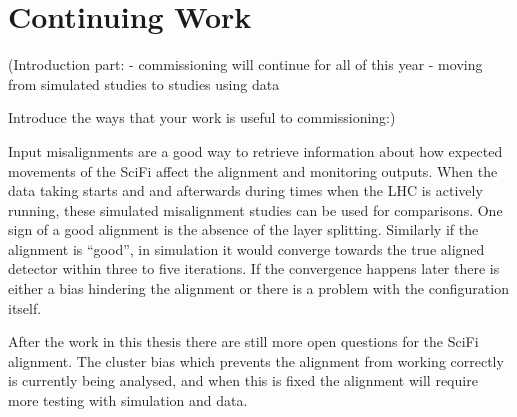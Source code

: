\chapter{Continuing Work}
\label{sec:continue}

(Introduction part:
- commissioning will continue for all of this year
- moving from simulated studies to studies using data

Introduce the ways that your work is useful to commissioning:)

Input misalignments are a good way to retrieve information about how expected movements of the SciFi affect the alignment and monitoring outputs. When the data taking starts and and afterwards during times when the LHC is actively running, these simulated misalignment studies can be used for comparisons.
One sign of a good alignment is the absence of the layer splitting.
Similarly if the alignment is ``good'', in simulation it would converge towards the true aligned detector within three to five iterations.
If the convergence happens later there is either a bias hindering the alignment or there is a problem with the configuration itself.

After the work in this thesis there are still more open questions for the SciFi alignment. The cluster bias which prevents the alignment from working correctly is currently being analysed, and when this is fixed the alignment will require more testing with simulation and data.

